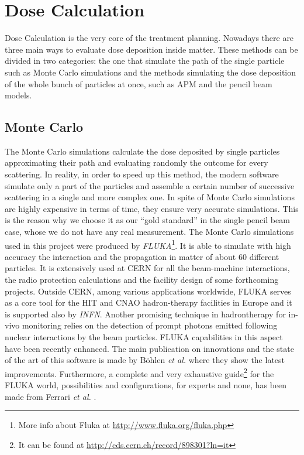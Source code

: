 \documentclass[12pt, a4paper, twoside]{book}
\begin{document}




\section{Dose Calculation}
Dose Calculation is the very core of the treatment planning. 
Nowadays there are three main ways to evaluate dose deposition inside matter. These methods can be divided in two categories: the one that simulate the path of the single particle such as Monte Carlo simulations and the methods simulating the dose deposition of the whole bunch of particles at once, such as APM and the pencil beam models.



\subsection{Monte Carlo}
The Monte Carlo simulations calculate the dose deposited by single particles approximating their path and evaluating randomly the outcome for every scattering. In reality, in order to speed up this method, the modern software simulate only a part of the particles and assemble a certain number of successive scattering in a single and more complex one. In spite of Monte Carlo simulations are highly expensive in terms of time, they ensure very accurate simulations. This is the reason why we choose it as our ``gold standard'' in the single pencil beam case, whose we do not have any real measurement.
The Monte Carlo simulations used in this project were produced by \emph{FLUKA}\footnote{More info about Fluka at \url{http://www.fluka.org/fluka.php}}. It is able to simulate with high accuracy the interaction and the propagation in matter of about 60 different particles. It is extensively used at CERN for all the beam-machine interactions, the radio protection calculations and the facility design of some forthcoming projects. 
Outside CERN, among various applications worldwide, FLUKA serves as a core tool for the HIT and CNAO hadron-therapy facilities in Europe and it is supported also by \emph{INFN}.
Another promising technique in hadrontherapy for in-vivo monitoring relies on the detection of prompt photons emitted following nuclear interactions by the beam particles. FLUKA capabilities in this aspect have been recently enhanced.
The main publication on innovations and the state of the art of this software is made by B\"ohlen \emph{et al.} \cite{boeh:fluka} where they show the latest improvements.
Furthermore, a complete and very exhaustive guide\footnote{It can be found at \url{http://cds.cern.ch/record/898301?ln=it}} for the FLUKA world, possibilities and configurations, for experts and none, has been made from Ferrari \emph{et al.} \cite{ferr:fluka}.
\end{document}
